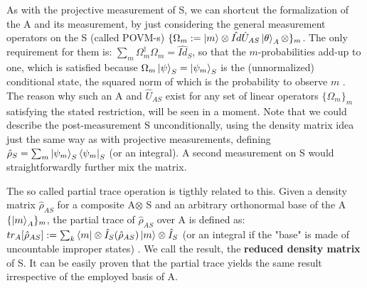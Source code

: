 \documentclass[11pt, a4paper]{article} %
\begin{document}
As with the projective measurement of S, we can shortcut the formalization of the A and its measurement, by just considering the general measurement operators on the S (called POVM-s) $\{\Omega_m:=\ket{m}\otimes\hat{Id}\hat{U}_{AS}\ket{\theta}_A\otimes\}_m$. The only requirement for them is: $\sum_m \Omega_m^\dagger\Omega_m=\hat{Id}_S$, so that the $m$-probabilities add-up to one, which is satisfied because $\Omega_m\ket{\psi}_S=\ket{\psi_m}_S$ is the (unnormalized) conditional state, the squared norm of which is the probability to observe $m$ \cite{Generalized, Durr}. The reason why such an A and $\hat{U}_{AS}$  exist for any set of linear operators $\{\Omega_m\}_m$ satisfying the stated restriction, will be seen in a moment. Note that we could describe the post-measurement S unconditionally, using the density matrix idea just the same way as with projective measurements, defining $\hat{\rho}_S=\sum_m \ket{\psi_m}_S\bra{\psi_m}_S$ (or an integral). A second measurement on S would straightforwardly further mix the matrix.

The so called partial trace operation is tigthly related to this. Given a density matrix $\hat{\rho}_{AS}$ for a composite A$\otimes$ S and an arbitrary orthonormal base of the A $\{\ket{m}_A\}_m$, the partial trace of $\hat{\rho}_{AS}$ over A is defined as: $tr_{A}[\hat{\rho}_{AS}] := \sum_k \bra{m}\otimes \hat{I}_S(\hat{\rho}_{AS})\ket{m}\otimes \hat{I}_S$ (or an integral if the "base" is made of uncountable improper states) \cite{Generalized, Durr}. We call the result, the {\bf reduced density matrix} of S. It can be easily proven that the partial trace yields the same result irrespective of the employed basis of A.
\end{document}
